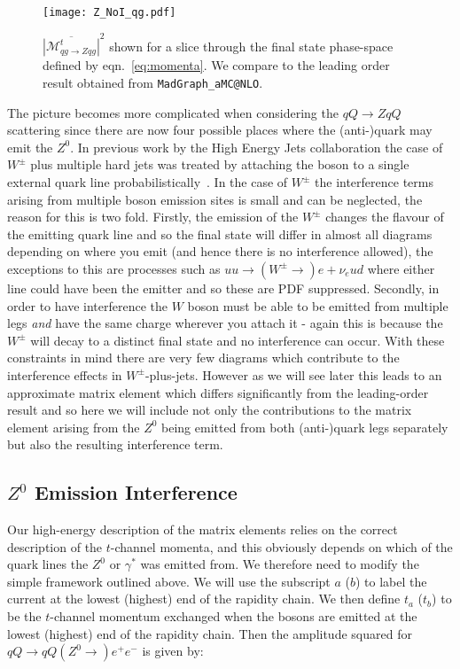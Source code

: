 		\begin{figure}[hbt]
			\centering
			\texttt{[image: Z\_NoI\_qg.pdf]}
			\caption{$\overline{|\mathcal{M}_{qg\to Zqg}^{t}|}^2$ shown for a slice through the
			final state phase-space defined by eqn.~\eqref{eq:momenta}.  We compare to the
			leading order result obtained from \texttt{MadGraph\_aMC@NLO}.}
			\label{fig:ZatLO}
		\end{figure}

		The picture becomes more complicated when considering the $qQ\to ZqQ$ scattering since
		there are now four possible places where the (anti-)quark may emit the $Z^0$.  In
		previous work by the High Energy Jets collaboration the case of $W^\pm$ plus multiple
		hard jets was treated by attaching the boson to a single external quark line
		probabilistically~\cite{Andersen:2012gk}.  In the case of $W^\pm$ the interference
		terms arising from multiple boson emission sites is small and can be neglected, the reason for this is two
		fold. Firstly, the emission of the $W^\pm$ changes the flavour of the emitting quark line and so the
		final state will differ in almost all diagrams depending on where you emit (and hence there is no
		interference allowed), the exceptions to this are processes such as $uu\to(W^\pm\to)e+\nu_eud$ where
		either line could have been the emitter and so these are PDF suppressed. Secondly, in order to have
		interference the $W$ boson must be able to be emitted from multiple legs \emph{and} have the same charge
		wherever you attach it - again this is because the $W^\pm$ will decay to a distinct final state and no
		interference can occur. With these constraints in mind there are very few diagrams which contribute to the
		interference effects in $W^\pm$-plus-jets.  However as we will see later this leads to an approximate matrix
		element which differs significantly from the leading-order result and so here we will include not only the
		contributions to the matrix element arising from the $Z^0$ being emitted from both (anti-)quark
		legs separately but also the resulting interference term.

	\subsection{$Z^0$ Emission Interference}

		Our high-energy
		description of the matrix elements relies on the correct description of the
		$t$-channel momenta, and this obviously depends on which of the quark lines
		the $Z^0$ or $\gamma^*$ was emitted from.  We therefore need to modify the simple
		framework outlined above.  We will use the subscript $a$ ($b$) to label the
		current at the lowest (highest) end of the rapidity chain.  We then define $t_a$
		($t_b$) to be the $t$-channel momentum exchanged when the bosons are emitted at
		the lowest (highest) end of the rapidity chain.  Then the amplitude squared
		for $qQ\to qQ(Z^0\to) e^+ e^-$ is given by:

